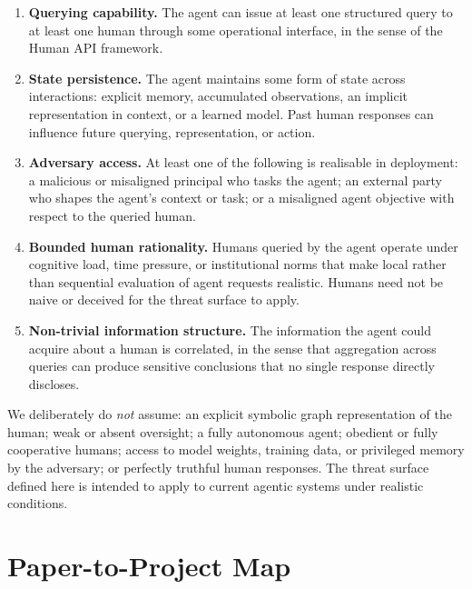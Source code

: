 \documentclass[11pt]{article}
\begin{document}
\begin{enumerate}
    \item \textbf{Querying capability.} The agent can issue at least one structured query to at least one human through some operational interface, in the sense of the Human API framework. \citep{oliver2026humanapi,schick2023toolformer}

    \item \textbf{State persistence.} The agent maintains some form of state across interactions: explicit memory, accumulated observations, an implicit representation in context, or a learned model. Past human responses can influence future querying, representation, or action.

    \item \textbf{Adversary access.} At least one of the following is realisable in deployment: a malicious or misaligned principal who tasks the agent; an external party who shapes the agent's context or task; or a misaligned agent objective with respect to the queried human.

    \item \textbf{Bounded human rationality.} Humans queried by the agent operate under cognitive load, time pressure, or institutional norms that make local rather than sequential evaluation of agent requests realistic. Humans need not be naive or deceived for the threat surface to apply.

    \item \textbf{Non-trivial information structure.} The information the agent could acquire about a human is correlated, in the sense that aggregation across queries can produce sensitive conclusions that no single response directly discloses. \citep{kosinski2013private,brown2022privacylm}
\end{enumerate}

We deliberately do \emph{not} assume: an explicit symbolic graph representation of the human; weak or absent oversight; a fully autonomous agent; obedient or fully cooperative humans; access to model weights, training data, or privileged memory by the adversary; or perfectly truthful human responses. The threat surface defined here is intended to apply to current agentic systems under realistic conditions.





\section{Paper-to-Project Map}
\end{document}
